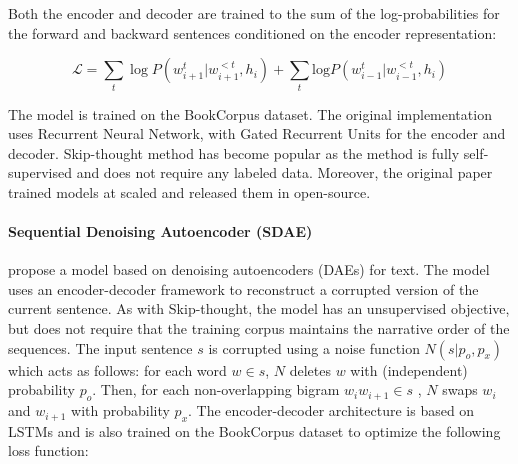 Both the encoder and decoder are trained to  the sum of the log-probabilities for the forward and backward sentences conditioned on the encoder representation:

\begin{equation*}
    \mathcal{L} = \sum_t \log P(w_{i+1}^t | w_{i+1}^{<t}, h_i) + \sum_t \text{log} P(w_{i-1}^t | w_{i-1}^{<t}, h_i)
\end{equation*}

The model is trained on the BookCorpus dataset. The original implementation uses Recurrent Neural Network, with Gated Recurrent Units \parencite{cho_14} for the encoder and decoder. Skip-thought method has become popular as the method is fully self-supervised and does not require any labeled data. Moreover, the original paper trained models at scaled and released them in open-source. 


\paragraph{Sequential Denoising Autoencoder (SDAE)} \textcite{hill_16} propose a model based on denoising autoencoders (DAEs) for text. The model uses an encoder-decoder framework to reconstruct a corrupted version of the current sentence. As with Skip-thought, the model has an unsupervised objective, but does not require that the training corpus maintains the narrative order of the sequences. The input sentence $s$ is corrupted using a noise function $N(s|p_o, p_x)$ which acts as follows: for each word $w \in s$, $N$ deletes $w$ with (independent) probability $p_o$. Then, for each non-overlapping bigram $w_iw_{i+1} \in s$ , $N$ swaps $w_i$ and $w_{i+1}$ with probability $p_x$. The encoder-decoder architecture is based on LSTMs and is also trained on the BookCorpus dataset to optimize the following loss function:

